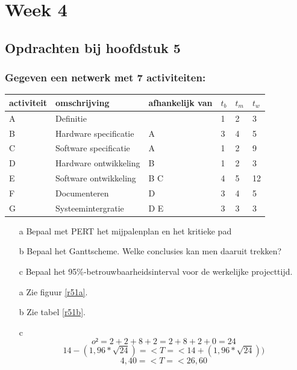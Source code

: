 \documentclass[a4paper,titlepage]{artikel1}
\begin{document}
   \section{Week 4}

   \subsection{Opdrachten bij hoofdstuk 5}
   \subsubsection[Opdracht 1]{Gegeven een netwerk met 7 activiteiten:}
   \begin{center}
     \begin{tabular}{|l|l|l|l|l|l|}
       \hline
       activiteit & omschrijving & afhankelijk van & $t_b$ & $t_m$ & $t_w$ \\
       \hline
       A & Definitie & & 1 & 2 & 3 \\
       B & Hardware specificatie & A & 3 & 4 & 5 \\
       C & Software specificatie & A & 1 & 2 & 9 \\
       D & Hardware ontwikkeling & B & 1 & 2 & 3 \\
       E & Software ontwikkeling & B C & 4 & 5 & 12 \\
       F & Documenteren & D & 3 & 4 & 5 \\
       G & Systeemintergratie & D E & 3 & 3 & 3 \\
       \hline
     \end{tabular}
   \end{center}
   \begin{itemize}
     \item[a] Bepaal met PERT het mijpalenplan en het kritieke pad
     \item[b] Bepaal het Ganttscheme. Welke conclusies kan men daaruit trekken?
     \item[c] Bepaal het 95\%-betrouwbaarheidsinterval voor de werkelijke projecttijd.
   \end{itemize}
   \begin{itemize}
     \item[a] Zie figuur \ref{r51a}.
     \item[b] Zie tabel \ref{r51b}.
     \item[c]
       \begin{displaymath}
         o²=2+2+8+2=2+8+2+0=24
       \end{displaymath}
       \begin{displaymath}
         14-(1,96*\sqrt{24})=<T=<14+(1,96*\sqrt{24}))
       \end{displaymath}
       \begin{displaymath}
         4,40=<T=<26,60
       \end{displaymath}
   \end{itemize}
\end{document}
